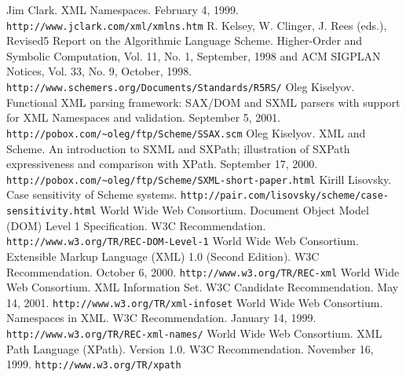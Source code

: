 \documentclass[10pt]{article}
\begin{document}
\begin{thebibliography}{}
 Jim Clark. XML Namespaces. February 4, 1999. \texttt{http://www.jclark.com/xml/xmlns.htm} 
 R. Kelsey, W. Clinger, J. Rees (eds.), Revised5 Report on
                      the Algorithmic Language Scheme. Higher-Order and
                      Symbolic Computation, Vol. 11, No. 1, September, 1998
                      and
                      ACM SIGPLAN Notices, Vol. 33, No. 9, October, 1998. \texttt{http://www.schemers.org/Documents/Standards/R5RS/} 
 Oleg Kiselyov. Functional XML parsing framework: SAX/DOM and
SXML parsers with support for XML Namespaces and validation. September
5, 2001. \texttt{http://pobox.com/\textasciitilde{}oleg/ftp/Scheme/SSAX.scm} 
 Oleg Kiselyov. XML and Scheme. An introduction to SXML and SXPath;
illustration of SXPath expressiveness and comparison with
XPath. September 17, 2000. \texttt{http://pobox.com/\textasciitilde{}oleg/ftp/Scheme/SXML-short-paper.html} 
 Kirill Lisovsky. Case sensitivity of Scheme systems. \texttt{http://pair.com/lisovsky/scheme/case-sensitivity.html} 
 World Wide Web Consortium. Document Object Model (DOM) Level 1
Specification. W3C Recommendation. \texttt{http://www.w3.org/TR/REC-DOM-Level-1} 
 World Wide Web Consortium. Extensible Markup Language (XML)
1.0 (Second Edition). W3C Recommendation. October 6, 2000. \texttt{http://www.w3.org/TR/REC-xml} 
 World Wide Web Consortium. XML Information Set. W3C Candidate Recommendation. May 14, 2001. \texttt{http://www.w3.org/TR/xml-infoset} 
 World Wide Web Consortium. Namespaces in XML. W3C Recommendation. January 14, 1999. \texttt{http://www.w3.org/TR/REC-xml-names/} 
 World Wide Web Consortium. XML Path Language (XPath).
Version 1.0. W3C Recommendation. November 16, 1999. \texttt{http://www.w3.org/TR/xpath} 
\end{thebibliography}
\end{document}
